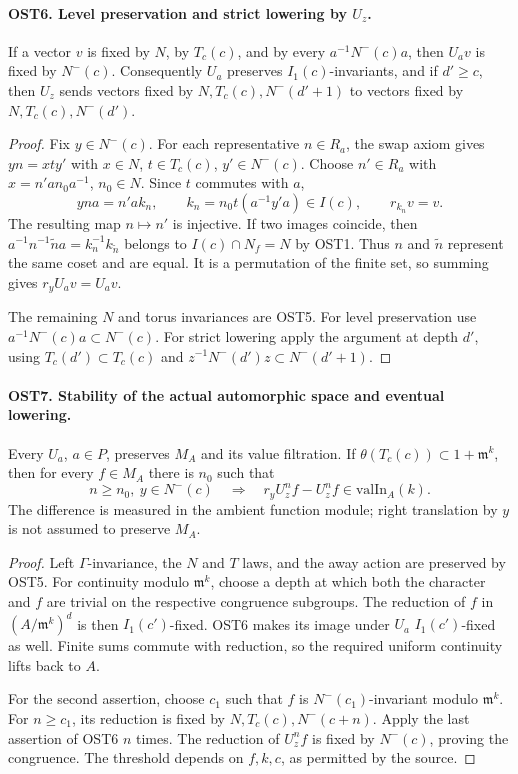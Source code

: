 \paragraph{OST6. Level preservation and strict lowering by $U_z$.}
\label{claim:OST6}
If a vector $v$ is fixed by $N$, by $T_c(c)$, and by every
$a^{-1}N^-(c)a$, then $U_av$ is fixed by $N^-(c)$.
Consequently $U_a$ preserves $I_1(c)$-invariants, and if
$d'\geq c$, then $U_z$ sends vectors fixed by
$N,T_c(c),N^-(d'+1)$ to vectors fixed by
$N,T_c(c),N^-(d')$.
\begin{proof}
Fix $y\in N^-(c)$.  For each representative $n\in R_a$,
the swap axiom gives $yn=x t y'$ with $x\in N$,
$t\in T_c(c)$, $y'\in N^-(c)$.  Choose $n'\in R_a$
with $x=n'a n_0a^{-1}$, $n_0\in N$.  Since $t$ commutes
with $a$,
\[
 yn a=n'a k_n,\qquad k_n=n_0t(a^{-1}y'a)\in I(c),
                       \qquad r_{k_n}v=v.
\]
The resulting map $n\mapsto n'$ is injective.  If two images
coincide, then
$a^{-1}n^{-1}\widetilde n a=k_n^{-1}k_{\widetilde n}$
belongs to $I(c)\cap N_f=N$ by OST1.  Thus $n$ and
$\widetilde n$ represent the same coset and are equal.
It is a permutation of the finite set, so summing gives
$r_yU_av=U_av$.

The remaining $N$ and torus invariances are OST5.
For level preservation use
$a^{-1}N^-(c)a\subset N^-(c)$.
For strict lowering apply the argument at depth $d'$,
using $T_c(d')\subset T_c(c)$ and
$z^{-1}N^-(d')z\subset N^-(d'+1)$.
\end{proof}

\paragraph{OST7. Stability of the actual automorphic space and eventual lowering.}
\label{claim:OST7}
Every $U_a$, $a\in P$, preserves $M_A$ and its value
filtration.  If $\theta(T_c(c))\subset1+\mathfrak m^k$,
then for every $f\in M_A$ there is $n_0$ such that
\begin{equation}\label{eq:ost-eventual-lowering}
 n\geq n_0,\ y\in N^-(c)
    \quad\Longrightarrow\quad
        r_yU_z^nf-U_z^nf\in\mathrm{valIn}_A(k).
\end{equation}
The difference is measured in the ambient function module;
right translation by $y$ is not assumed to preserve $M_A$.
\begin{proof}
Left $\Gamma$-invariance, the $N$ and $T$ laws, and the
away action are preserved by OST5.  For continuity modulo
$\mathfrak m^k$, choose a depth at which both the character
and $f$ are trivial on the respective congruence subgroups.
The reduction of $f$ in $(A/\mathfrak m^k)^d$ is then
$I_1(c')$-fixed.  OST6 makes its image under $U_a$
$I_1(c')$-fixed as well.  Finite sums commute with reduction,
so the required uniform continuity lifts back to $A$.

For the second assertion, choose $c_1$ such that $f$ is
$N^-(c_1)$-invariant modulo $\mathfrak m^k$.  For $n\geq c_1$,
its reduction is fixed by $N,T_c(c),N^-(c+n)$.
Apply the last assertion of OST6 $n$ times.  The reduction of
$U_z^nf$ is fixed by $N^-(c)$, proving the congruence.
The threshold depends on $f,k,c$, as permitted by the source.
\end{proof}

